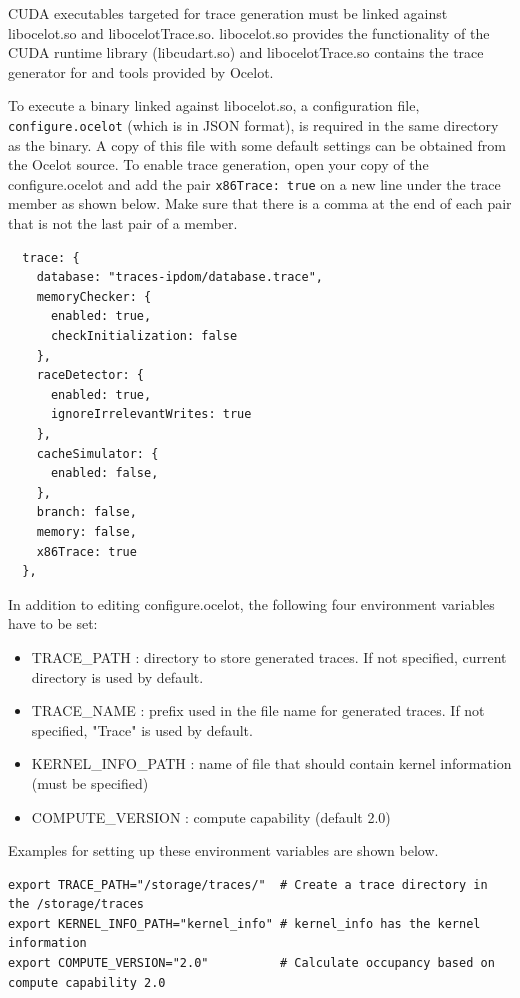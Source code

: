 CUDA executables targeted for trace generation must be linked against
libocelot.so and libocelotTrace.so. libocelot.so provides the functionality of
the CUDA runtime library (libcudart.so) and libocelotTrace.so contains the
trace generator for \SIM and tools provided by Ocelot.

To execute a binary linked against libocelot.so, a configuration file,
   \Verb+configure.ocelot+ (which is in JSON format), is required in the same
   directory as the binary. A copy of this file with some default settings can
   be obtained from the Ocelot source. To enable trace generation, open your
   copy of the configure.ocelot and add the pair \Verb+x86Trace: true+ on a new
   line under the trace member as shown below.  Make sure that there is a comma
   at the end of each pair that is not the last pair of a member.

\begin{Verbatim}
  trace: {
    database: "traces-ipdom/database.trace",
    memoryChecker: {
      enabled: true,
      checkInitialization: false
    },
    raceDetector: {
      enabled: true,
      ignoreIrrelevantWrites: true
    },
    cacheSimulator: {
      enabled: false,
    },
    branch: false,
    memory: false,
    x86Trace: true
  },
\end{Verbatim}

In addition to editing configure.ocelot, the following four environment
variables have to be set:

\begin{itemize}\itemsep2pt
\item TRACE\_PATH : directory to store generated traces. If not specified, current directory is used by default.
\item TRACE\_NAME : prefix used in the file name for generated traces. If not specified, "Trace" is used by default.
\item KERNEL\_INFO\_PATH : name of file that should contain kernel information (must be specified)
\item COMPUTE\_VERSION : compute capability (default 2.0)
\end{itemize}


Examples for setting up these environment variables are shown below.

\begin{Verbatim}
export TRACE_PATH="/storage/traces/"  # Create a trace directory in the /storage/traces
export KERNEL_INFO_PATH="kernel_info" # kernel_info has the kernel information
export COMPUTE_VERSION="2.0"          # Calculate occupancy based on compute capability 2.0
\end{Verbatim}

